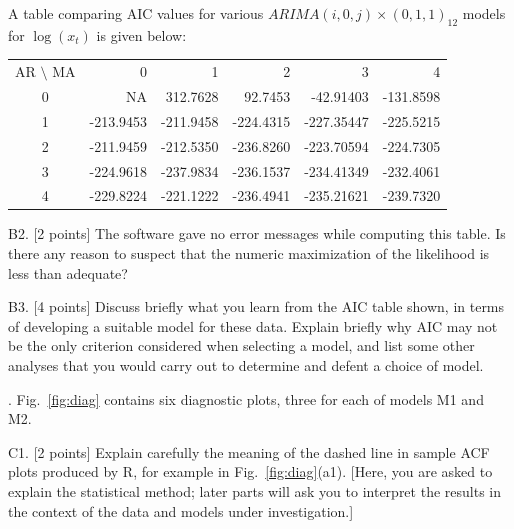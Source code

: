 \documentclass[11pt]{article}
\def\qspace{\vspace{1.5in}}
\begin{document}
A table comparing AIC values for various
$ARIMA(i,0,j)\times(0,1,1)_{12}$ models for $\log(x_t)$ is given below:

\begin{tabular}{crrrrr}
AR $\setminus$ MA & 0 & 1 & 2& 3& 4\\
  0&        NA  &312.7628 &  92.7453  &-42.91403 &-131.8598\\
1& -213.9453 &-211.9458 &-224.4315 &-227.35447 &-225.5215\\
2& -211.9459 &-212.5350 &-236.8260 &-223.70594 &-224.7305\\
3& -224.9618 &-237.9834 &-236.1537 &-234.41349 &-232.4061\\
4& -229.8224 &-221.1222 &-236.4941 &-235.21621 &-239.7320\\
\end{tabular}

B2. [2 points] The software gave no error messages while computing this
table. Is there any reason to suspect that the numeric
maximization of the likelihood is less than adequate?

\qspace

\newpage
B3. [4 points] Discuss briefly what you learn from the AIC table shown, in terms of developing a suitable model for these data.
Explain briefly why AIC may not be the only criterion
considered when selecting a model, and list some other analyses that you would carry out to determine and defent a choice of model.

\vspace{5in}

. Fig.~\ref{fig:diag} contains six diagnostic plots, three for each of models M1 and M2.

C1. [2 points] Explain carefully the meaning of the dashed line in sample
ACF plots produced by R, for example in Fig.~\ref{fig:diag}(a1). [Here, you are asked to explain the statistical method; later parts will ask you to interpret the results in the context of the data and models under investigation.]

\vspace{2in}

\end{document}
